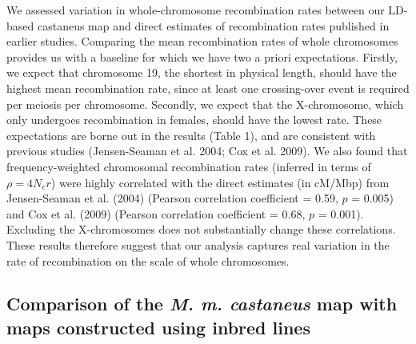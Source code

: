 We assessed variation in whole-chromosome recombination rates between our LD-based castaneus map and direct estimates of recombination rates published in earlier studies. Comparing the mean recombination rates of whole chromosomes provides us with a baseline for which we have two a priori expectations. Firstly, we expect that chromosome 19, the shortest in physical length, should have the highest mean recombination rate, since at least one crossing-over event is required per meiosis per chromosome. Secondly, we expect that the X-chromosome, which only undergoes recombination in females, should have the lowest rate. These expectations are borne out in the results (Table 1), and are consistent with previous studies (Jensen-Seaman et al. 2004; Cox et al. 2009). We also found that frequency-weighted chromosomal recombination rates (inferred in terms of $\rho = 4N_er$) were highly correlated with the direct estimates (in cM/Mbp) from Jensen-Seaman et al. (2004) (Pearson correlation coefficient = 0.59, $p$ = 0.005) and Cox et al. (2009) (Pearson correlation coefficient = 0.68, $p$ = 0.001). Excluding the X-chromosomes does not substantially change these correlations. These results therefore suggest that our analysis captures real variation in the rate of recombination on the scale of whole chromosomes. 

\subsection{Comparison of the \textit{M. m. castaneus} map with maps constructed using inbred lines}
 
